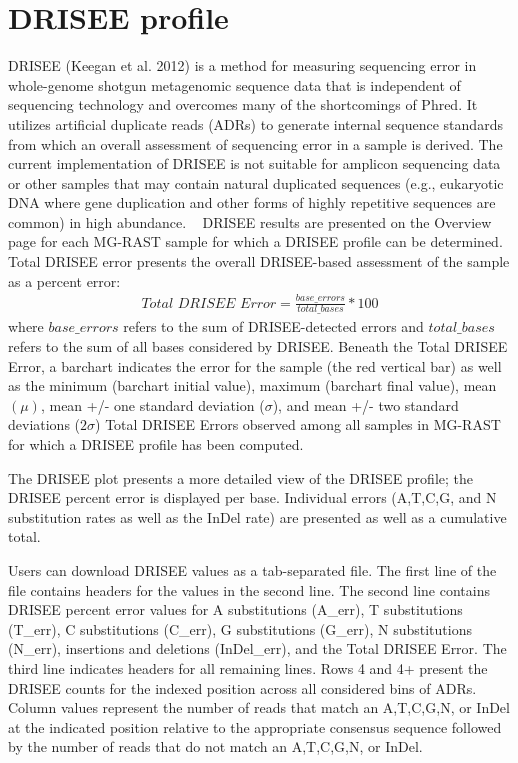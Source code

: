 \documentclass[letterpaper,10pt,english]{sphinxmanual}
\begin{document}
\section{DRISEE profile}
\label{\detokenize{user_manual:drisee-profile}}\label{\detokenize{user_manual:driseedetail}}
DRISEE (Keegan et al. 2012) is a method for measuring sequencing error
in whole-genome shotgun metagenomic sequence data that is independent of
sequencing technology and overcomes many of the shortcomings of Phred.
It utilizes artificial duplicate reads (ADRs) to generate internal
sequence standards from which an overall assessment of sequencing error
in a sample is derived. The current implementation of DRISEE is not
suitable for amplicon sequencing data or other samples that may contain
natural duplicated sequences (e.g., eukaryotic DNA where gene
duplication and other forms of highly repetitive sequences are common)
in high abundance.   DRISEE results are presented on the Overview page
for each MG-RAST sample for which a DRISEE profile can be determined.
Total DRISEE error presents the overall DRISEE-based assessment of the
sample as a percent error:
\begin{equation*}
\begin{split}Total \,\, DRISEE \,\, Error = \frac{base\_errors}{total\_bases} * 100\end{split}
\end{equation*}
where \({base\_errors}\) refers to the sum of DRISEE-detected errors
and \({total\_bases}\) refers to the sum of all bases considered by
DRISEE. Beneath the Total DRISEE Error, a barchart indicates the error
for the sample (the red vertical bar) as well as the minimum (barchart
initial value), maximum (barchart final value), mean \((\mu)\), mean
+/- one standard deviation (\(\sigma\)), and mean +/- two standard
deviations (\(2\sigma\)) Total DRISEE Errors observed among all
samples in MG-RAST for which a DRISEE profile has been computed.

The DRISEE plot presents a more detailed view of the DRISEE profile; the
DRISEE percent error is displayed per base. Individual errors (A,T,C,G,
and N substitution rates as well as the InDel rate) are presented as
well as a cumulative total.

Users can download DRISEE values as a tab-separated file. The first line
of the file contains headers for the values in the second line. The
second line contains DRISEE percent error values for A substitutions
(A\_err), T substitutions (T\_err), C substitutions (C\_err), G
substitutions (G\_err), N substitutions (N\_err), insertions and deletions
(InDel\_err), and the Total DRISEE Error. The third line indicates
headers for all remaining lines. Rows 4 and 4+ present the DRISEE counts
for the indexed position across all considered bins of ADRs. Column
values represent the number of reads that match an A,T,C,G,N, or InDel
at the indicated position relative to the appropriate consensus sequence
followed by the number of reads that do not match an A,T,C,G,N, or
InDel.
\end{document}
